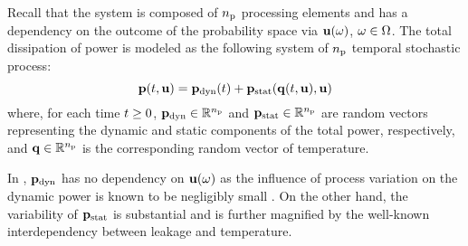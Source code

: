 Recall that the system is composed of ${n_\text{p}}$ processing elements and has a dependency on the outcome of the probability space via $\mathbf{u}(\omega)$, $\omega \in \Omega$.
The total dissipation of power is modeled as the following system of ${n_\text{p}}$ temporal stochastic process:
\begin{equation} \elab{power-model}
  \vP(\t, \vu) = \vP_\dynamic(\t) + \vP_\static(\vQ(\t, \vu), \vu)
\end{equation}
where, for each time $t \geq 0$, $\mathbf{p}_{\text{dyn}} \in \mathbb{R}^{n_\text{p}}$ and $\mathbf{p}_{\text{stat}} \in \mathbb{R}^{n_\text{p}}$ are random vectors representing the dynamic and static components of the total power, respectively, and $\mathbf{q} \in \mathbb{R}^{n_\text{p}}$ is the corresponding random vector of temperature.
\begin{remark}
In , \textnormal{$\mathbf{p}_{\text{dyn}}$} has no dependency on $\mathbf{u}(\omega)$ as the influence of process variation on the dynamic power is known to be negligibly small \cite{srivastava2010}.
On the other hand, the variability of \textnormal{$\mathbf{p}_{\text{stat}}$} is substantial and is further magnified by the well-known interdependency between leakage and temperature.
\end{remark}
